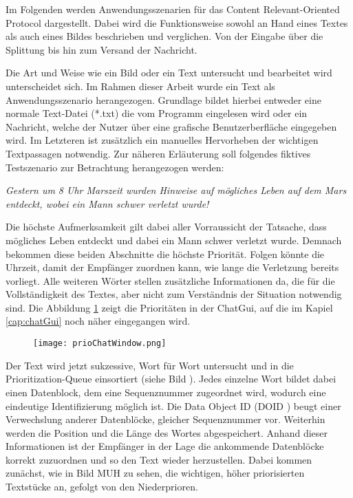 \label{sec:Anwendungsszenarien}

Im Folgenden werden Anwendungsszenarien für das Content
Relevant-Oriented Protocol dargestellt. Dabei wird die Funktionsweise sowohl an
Hand eines Textes als auch eines Bildes beschrieben und verglichen. Von der
Eingabe über die Splittung bis hin zum Versand der Nachricht. 

Die Art und Weise wie ein Bild oder ein Text untersucht und bearbeitet wird
unterscheidet sich. Im Rahmen dieser Arbeit wurde ein Text als
Anwendungsszenario herangezogen. Grundlage bildet hierbei entweder eine
normale Text-Datei (*.txt) die vom Programm eingelesen wird oder ein Nachricht,
welche der Nutzer über eine grafische Benutzerberfläche eingegeben wird.
Im Letzteren ist zusätzlich ein manuelles Hervorheben der wichtigen Textpassagen
notwendig. Zur näheren Erläuterung soll folgendes fiktives Testszenario zur
Betrachtung herangezogen werden:

\textit{\glqq Gestern um 8 Uhr Marszeit wurden Hinweise auf mögliches Leben auf
dem Mars entdeckt, wobei ein Mann schwer verletzt wurde! \grqq}

Die höchste Aufmerksamkeit gilt dabei aller Vorraussicht der Tatsache, dass
mögliches Leben entdeckt und dabei ein Mann schwer verletzt wurde. Demnach
bekommen diese beiden Abschnitte die höchste Priorität. Folgen könnte die
Uhrzeit, damit der Empfänger zuordnen kann, wie lange die Verletzung bereits
vorliegt. Alle weiteren Wörter stellen zusätzliche Informationen da, die für die
Vollständigkeit des Textes, aber nicht zum Verständnis der Situation notwendig
sind. Die Abbildung \ref{fig:prioChatWindow} zeigt die Prioritäten in der
ChatGui, auf die im Kapiel \ref{cap:chatGui} noch näher eingegangen wird.

\begin{figure}[H]
	\centering
	\texttt{[image: prioChatWindow.png]}
	\label{fig:prioChatWindow}
\end{figure}

Der Text wird jetzt sukzessive, Wort für Wort untersucht und in die
Prioritization-Queue einsortiert (siehe Bild ). Jedes einzelne Wort bildet dabei einen Datenblock, dem eine
Sequenznummer zugeordnet wird, wodurch eine eindeutige Identifizierung möglich
ist. Die Data Object ID (DOID ) beugt einer Verwechslung anderer Datenblöcke, gleicher
Sequenznummer vor. Weiterhin werden die Position und die Länge des Wortes abgespeichert. Anhand dieser Informationen ist der Empfänger in der Lage
die ankommende Datenblöcke korrekt zuzuordnen und so den Text wieder herzustellen.
Dabei kommen zunächst, wie in Bild MUH  zu sehen, die wichtigen, höher priorisierten Textstücke an, gefolgt
von den Niederprioren. 

